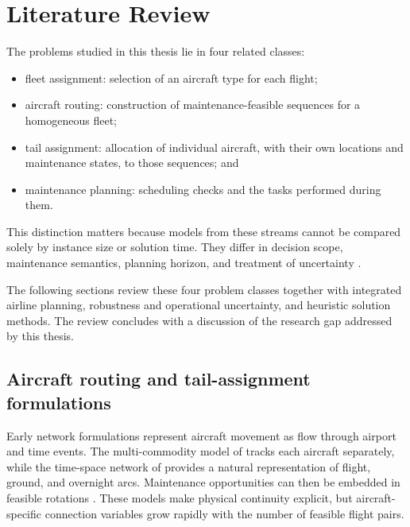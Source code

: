 \section{Literature Review}
\label{sec:literature}

The problems studied in this thesis lie in four related classes:
\begin{itemize}
	\item fleet assignment: selection of an aircraft type for each flight;
	\item aircraft routing: construction of maintenance-feasible sequences for a homogeneous fleet;
	\item tail assignment: allocation of individual aircraft, with their own locations and maintenance states, to those sequences; and
	\item maintenance planning: scheduling checks and the tasks performed during them.
\end{itemize}
This distinction matters because models from these streams cannot be compared solely by instance size or solution
time. They differ in decision scope, maintenance semantics, planning horizon,
and treatment of uncertainty \citep{gopalan1998mathematical,
barnhart2003applications, lacasse2010aircraft}. 

The following sections review these four problem classes together with integrated airline planning, robustness and operational uncertainty, and heuristic solution methods.
The review concludes with a discussion of the research gap addressed by this thesis.

\subsection{Aircraft routing and tail-assignment formulations}

Early network formulations represent aircraft movement as flow through airport
and time events. The multi-commodity model of \citet{levin1971scheduling}
tracks each aircraft separately, while the time-space network of
\citet{hane1995fleet} provides a natural representation of flight, ground, and
overnight arcs. Maintenance opportunities can then be embedded in feasible
rotations \citep{clarke1996maintenance, clarke1997aircraft}. These models make
physical continuity explicit, but aircraft-specific connection variables grow
rapidly with the number of feasible flight pairs.

